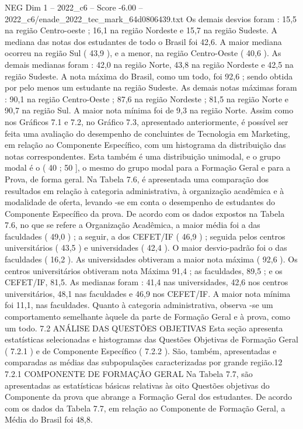 \begin{textsample}{NEG Dim 1 – 2022\_c6 – Score -6.00 – 2022\_c6/enade\_2022\_tec\_mark\_64d0806439.txt}
Os demais desvios foram : 15,5 na região Centro-oeste ; 16,1 na região Nordeste e 15,7 na região Sudeste.
A mediana das notas dos estudantes de todo o Brasil foi 42,6.
A maior mediana ocorreu na região Sul ( 43,9 ), e a menor, na região Centro-Oeste ( 40,6 ).
As demais medianas foram : 42,0 na região Norte, 43,8 na região Nordeste e 42,5 na região Sudeste.
A nota máxima do Brasil, como um todo, foi 92,6 ; sendo obtida por pelo menos um estudante na região Sudeste.
As demais notas máximas foram : 90,1 na região Centro-Oeste ; 87,6 na região Nordeste ; 81,5 na região Norte e 90,7 na região Sul.
A maior nota mínima foi de 9,3 na região Norte.
Assim como nos Gráficos 7.1 e 7.2, no Gráfico 7.3, apresentado anteriormente, é possível ser feita uma avaliação do desempenho de concluintes de Tecnologia em Marketing, em relação ao Componente Específico, com um histograma da distribuição das notas correspondentes.
Esta também é uma distribuição unimodal, e o grupo modal é o ( 40 ; 50 ], o mesmo do grupo modal para a Formação Geral e para a Prova, de forma geral.
Na Tabela 7.6, é apresentada uma comparação dos resultados em relação à categoria administrativa, à organização acadêmica e à modalidade de oferta, levando -se em conta o desempenho de estudantes do Componente Específico da prova.
De acordo com os dados expostos na Tabela 7.6, no que se refere a Organização Acadêmica, a maior média foi a das faculdades ( 49,0 ) ; a seguir, a dos CEFET/IF ( 46,9 ) ; seguida pelos centros universitários ( 43,5 ) e universidades ( 42,4 ).
O maior desvio-padrão foi o das faculdades ( 16,2 ).
As universidades obtiveram a maior nota máxima ( 92,6 ).
Os centros universitários obtiveram nota Máxima 91,4 ; as faculdades, 89,5 ; e os CEFET/IF, 81,5.
As medianas foram : 41,4 nas universidades, 42,6 nos centros universitários, 48,1 nas faculdades e 46,9 nos CEFET/IF.
A maior nota mínima foi 11,1, nas faculdades.
Quanto à categoria administrativa, observa -se um comportamento semelhante àquele da parte de Formação Geral e à prova, como um todo. 7.2 ANÁLISE DAS QUESTÕES OBJETIVAS Esta seção apresenta estatísticas selecionadas e histogramas das Questões Objetivas de Formação Geral ( 7.2.1 ) e de Componente Específico ( 7.2.2 ).
São, também, apresentadas e comparadas as médias das subpopulações caracterizadas por grande região.12 7.2.1 COMPONENTE DE FORMAÇÃO GERAL Na Tabela 7.7, são apresentadas as estatísticas básicas relativas às oito Questões objetivas do Componente da prova que abrange a Formação Geral dos estudantes.
De acordo com os dados da Tabela 7.7, em relação ao Componente de Formação Geral, a Média do Brasil foi 48,8.

\end{textsample}
